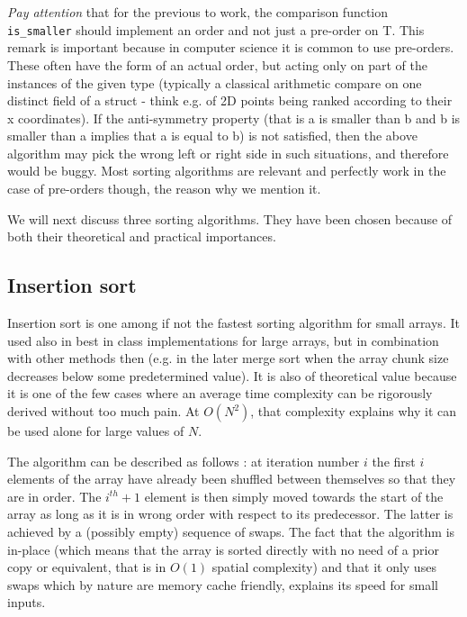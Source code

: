 \documentclass[12pt]{article}
\theoremstyle{plain}
\theoremstyle{remark}
\begin{document}
{\it Pay attention} that for the previous to work, the comparison function {\tt
is\_smaller} should implement an order and not just a pre-order on T. This remark
is important because in computer science it is common to use pre-orders. These
often have the form of an actual order, but acting only on part of the instances
of the given type
(typically a classical arithmetic compare on one distinct field of a struct -
think  e.g. of 2D points being ranked according to their x coordinates).
If the anti-symmetry property (that is a is smaller than b and b is smaller than
a implies that a is equal to b) is not satisfied, then the above algorithm may 
pick the wrong left or right side in such situations, and therefore would be
buggy. Most sorting algorithms are relevant and perfectly work in the case of 
pre-orders though, the reason why we mention it.


We will next discuss three sorting algorithms. They have been chosen because of
both their theoretical and practical importances.

\subsection{Insertion sort}

Insertion sort is one among if not the fastest sorting algorithm for small
arrays. It used also in best in class implementations for large arrays, but
in combination with other methods then (e.g. in the later merge sort when 
the array chunk size decreases below some predetermined value).  It is also
of theoretical value because it is one of the few cases where an average
time complexity can be rigorously derived without too much pain. At $O(N^2)$,
that complexity explains why it can be used alone for large values of $N.$

The algorithm can be described as follows : at iteration number $i$ the first
$i$ elements of the array have already been shuffled between themselves so 
that they are in order. The $i^{th} + 1$ element is then simply moved towards
the start of the array as long as it is in wrong order with respect to its
predecessor. The latter is achieved by a (possibly empty) sequence of swaps. 
The fact that the algorithm is in-place (which means that the array is sorted
directly with no need of a prior copy or equivalent, that is in $O(1)$ spatial 
complexity) and that it only uses swaps which by nature are memory cache
friendly, explains its speed for small inputs.
\end{document}
